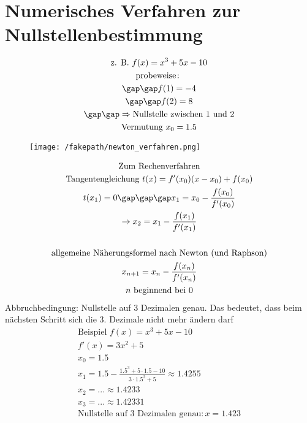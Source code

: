 \section{Numerisches Verfahren zur Nullstellenbestimmung}
\begin{gather*}
  \text{z. B. } f(x) = x^3 + 5x - 10 \\
  \text{probeweise} \colon \\
  \gap\gap f(1) = -4 \\
  \gap\gap f(2) = 8 \\
  \gap\gap \Rightarrow \text{Nullstelle zwischen 1 und 2} \\
  \text{Vermutung } x_0 = 1.5
\end{gather*}
\begin{figure}[H]
  \centering
  \texttt{[image: /fakepath/newton\_verfahren.png]}
\end{figure}
\begin{gather*}
  \text{Zum Rechenverfahren} \\
  \text{Tangentengleichung } t(x) = f'(x_0)(x - x_0) + f(x_0) \\
  t(x_1) = 0 \gap\gap\gap x_1 = x_0 - \frac{f(x_0)}{f'(x_0)} \\
  \rightarrow x_2 = x_1 - \frac{f(x_1)}{f'(x_1)} \\\\
  \text{allgemeine Näherungsformel nach Newton (und Raphson)} \\
  x_{n + 1} = x_n - \frac{f(x_n)}{f'(x_n)} \\
  n \text{ beginnend bei 0}
\end{gather*}
Abbruchbedingung: Nullstelle auf 3 Dezimalen genau. Das bedeutet, dass beim nächsten Schritt sich die 3. Dezimale nicht mehr ändern darf
\newpage
\begin{gather*}
  \text{Beispiel } f(x) = x^3 + 5x - 10 \\
  f'(x) = 3x^2 + 5 \\
  x_0 = 1.5 \\
  x_1 = 1.5 - \frac{1.5^3 + 5 \cdot 1.5 - 10}{3 \cdot 1.5^2 + 5} \approx 1.4255 \\
  x_2 = ... \approx 1.4233 \\
  x_3 = ... \approx 1.42331 \\
  \text{Nullstelle auf 3 Dezimalen genau} \colon x = 1.423
\end{gather*}
